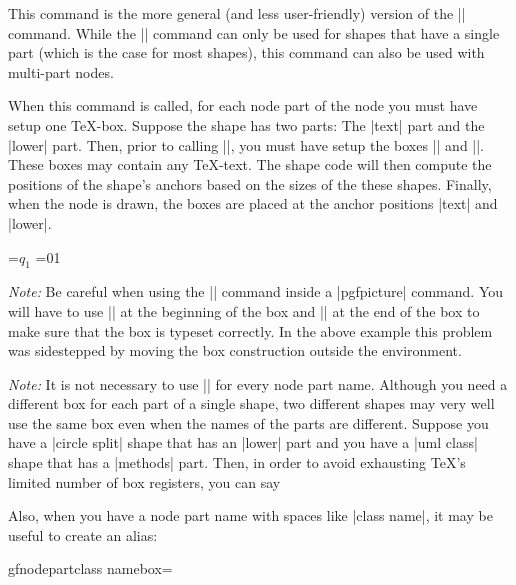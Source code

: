\begin{command}{\pgfmultipartnode{}}
  This command is the more general (and less user-friendly) version of
  the |\pgfnode| command. While the |\pgfnode| command can only be
  used for shapes that have a single part (which is the case for most
  shapes), this command can also be used with multi-part nodes.

  When this command is called, for each node part of the node you must
  have setup one \TeX-box. Suppose the shape has two parts: The |text|
  part and the |lower| part. Then, prior to calling
  |\pgfmultipartnode|, you must have setup the boxes
  |\pgfnodeparttextbox| and |\pgfnodepartlowerbox|. These boxes may 
  contain any \TeX-text. The shape code will then compute the
  positions of the shape's anchors based on the sizes of the these
  shapes. Finally, when the node is drawn, the boxes are placed at the
  anchor positions |text| and |lower|.

\begin{codeexample}[]
\setbox\pgfnodeparttextbox=\hbox{$q_1$}
\setbox\pgfnodepartlowerbox=\hbox{01}
\begin{pgfpicture}
\end{pgfpicture}
\end{codeexample}

  \emph{Note:\/} Be careful when using the |\setbox| command inside a
  |{pgfpicture}| command. You will have to use |\pgfinterruptpath| at
  the beginning of the box and |\endpgfinterruptpath| at the end of
  the box to make sure that the box is typeset correctly. In the above
  example this problem was sidestepped by moving the box construction
  outside the environment.

  \emph{Note:\/} It is not necessary to use |\newbox| for every node
  part name. Although you need a different box for each part of a
  single shape, two different shapes may very well use the same box
  even when the names of the parts are different. Suppose you have a
  |circle split| shape that has an |lower| part and you have a
  |uml class| shape that has a |methods| part. Then, in order to avoid
  exhausting \TeX's limited number of box registers, you can say
\begin{codeexample}
\newbox\pgfnodepartlowerbox
\let\pgfnodepartmethodsbox=\pgfnodepartlowerbox  
\end{codeexample}
  Also, when you have a node part name with spaces like |class name|,
  it may be useful to create an alias:
\begin{codeexample}
\newbox\mybox
\expandafter\let\csname pgfnodepartclass namebox\endcsname=\mybox
\end{codeexample}
\end{command}

